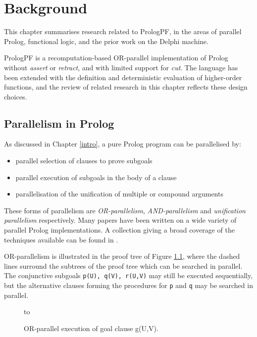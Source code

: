 \chapter{Background}
\label{background}

This chapter summarises research related to PrologPF, in the areas of
parallel Prolog, functional logic, and the prior work on the
Delphi machine.

PrologPF is a recomputation-based OR-parallel implementation of Prolog
without \textit{assert} or \textit{retract}, and with limited support
for \textit{cut}.
The language has been extended with the definition and deterministic evaluation
of higher-order functions, and the review of related research in this 
chapter reflects these design choices.

\section{Parallelism in Prolog} %

As discussed in Chapter \ref{intro}, a pure Prolog program can be
parallelised by:
\begin{itemize}
\item{parallel selection of clauses to prove subgoals}
\item{parallel execution of subgoals in the body of a clause}
\item{parallelisation of the unification of multiple or compound arguments}
\end{itemize}

These forms of parallelism are \textit{OR-parallelism}, \textit{AND-parallelism}
and \textit{unification parallelism} respectively.  Many papers have been written
on a wide variety of parallel Prolog implementations.  A collection giving a broad
coverage of the techniques available can be found in \cite{KW92}.

OR-parallelism is illustrated in the proof tree of Figure \ref{or_parallelism}, where
the dashed lines surround the subtrees of the proof tree which can be searched in
parallel.  The conjunctive subgoals \texttt{p(U), q(V), r(U,V)} may still be
executed sequentially, but the alternative 
clauses forming the procedures for \texttt{p} and
\texttt{q} may be searched in parallel.

\begin{figure}[h]
\vspace{5mm} \hbox to 
\caption{OR-parallel execution of goal clause g(U,V).}
\vspace{5mm}
\label{or_parallelism}
\end{figure}

